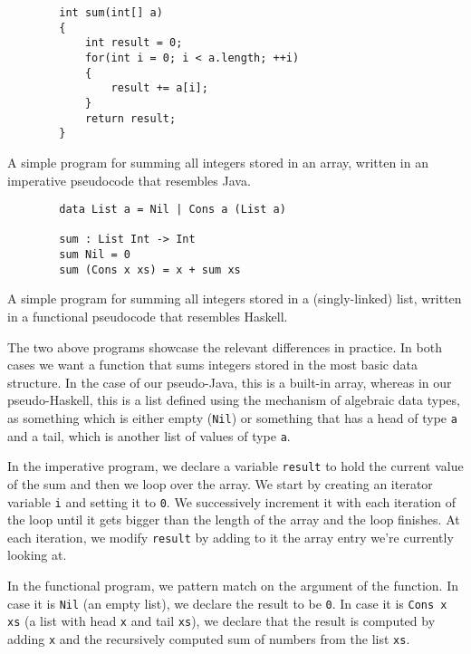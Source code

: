 \documentclass[declaration,mgr,english,shortabstract]{iithesis}
\newcommand{\m}[1]{\texttt{#1}}
\begin{document}
\begin{listing}[H]
    \begin{verbatim}
        int sum(int[] a)
        {
            int result = 0;
            for(int i = 0; i < a.length; ++i)
            {
                result += a[i];
            }
            return result;
        }
    \end{verbatim}
    \caption{A simple program for summing all integers stored in an array, written in an imperative pseudocode that resembles Java.}
\end{listing}

\begin{listing}[H]
    \begin{verbatim}
        data List a = Nil | Cons a (List a)

        sum : List Int -> Int
        sum Nil = 0
        sum (Cons x xs) = x + sum xs
    \end{verbatim}
    \begin{center}
        \caption{A simple program for summing all integers stored in a (singly-linked) list, written in a functional pseudocode that resembles Haskell.}
    \end{center}
\end{listing}

The two above programs showcase the relevant differences in practice. In both cases we want a function that sums integers stored in the most basic data structure. In the case of our pseudo-Java, this is a built-in array, whereas in our pseudo-Haskell, this is a list defined using the mechanism of algebraic data types, as something which is either empty (\m{Nil}) or something that has a head of type \m{a} and a tail, which is another list of values of type \m{a}.

In the imperative program, we declare a variable \m{result} to hold the current value of the sum and then we loop over the array. We start by creating an iterator variable \m{i} and setting it to \m{0}. We successively increment it with each iteration of the loop until it gets bigger than the length of the array and the loop finishes. At each iteration, we modify \m{result} by adding to it the array entry we're currently looking at.

In the functional program, we pattern match on the argument of the function. In case it is \m{Nil} (an empty list), we declare the result to be \m{0}. In case it is \m{Cons x xs} (a list with head \m{x} and tail \m{xs}), we declare that the result is computed by adding \m{x} and the recursively computed sum of numbers from the list \m{xs}.
\end{document}
